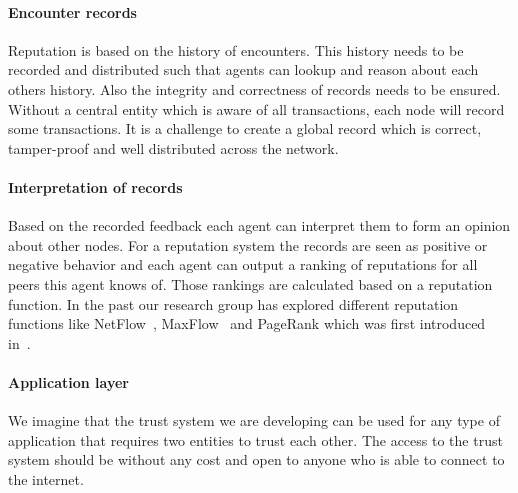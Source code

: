 \paragraph{Encounter records} Reputation is based on the history of encounters. This history needs 
to be recorded and distributed such that agents can lookup and reason about each others history. Also
the integrity and correctness of records needs to be ensured. Without a central entity
which is aware of all transactions, each node will record some transactions. It is a challenge to 
create a global record which is correct, tamper-proof and well distributed across the network.

\paragraph{Interpretation of records} Based on the recorded feedback each agent can interpret them
to form an opinion about other nodes. For a reputation system the records are seen as positive or
negative behavior and each agent can output a ranking of reputations for all peers this agent knows
of. Those rankings are calculated based on a reputation function. In the past our research group has
explored different reputation functions like NetFlow~\cite{OTTE2017}, 
MaxFlow~\cite{meulpolder2009bartercast} and PageRank which was first introduced in~\cite{page1999pagerank}.

\paragraph{Application layer} We imagine that the trust system we are developing can be used 
for any type of application that requires two entities to trust each other. The access to the trust
system should be without any cost and open to anyone who is able to connect to the internet.

